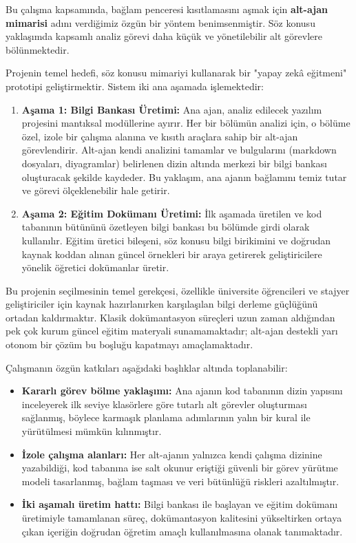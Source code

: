 Bu çalışma kapsamında, bağlam penceresi kısıtlamasını aşmak için \textbf{alt-ajan mimarisi} adını verdiğimiz özgün bir yöntem benimsenmiştir. Söz konusu yaklaşımda kapsamlı analiz görevi daha küçük ve yönetilebilir alt görevlere bölünmektedir.

Projenin temel hedefi, söz konusu mimariyi kullanarak bir "yapay zekâ eğitmeni" prototipi geliştirmektir. Sistem iki ana aşamada işlemektedir:
\begin{enumerate}
    \item \textbf{Aşama 1: Bilgi Bankası Üretimi:} Ana ajan, analiz edilecek yazılım projesini mantıksal modüllerine ayırır. Her bir bölümün analizi için, o bölüme özel, izole bir çalışma alanına ve kısıtlı araçlara sahip bir alt-ajan görevlendirir. Alt-ajan kendi analizini tamamlar ve bulgularını (markdown dosyaları, diyagramlar) belirlenen dizin altında merkezi bir bilgi bankası oluşturacak şekilde kaydeder. Bu yaklaşım, ana ajanın bağlamını temiz tutar ve görevi ölçeklenebilir hale getirir.
    \item \textbf{Aşama 2: Eğitim Dokümanı Üretimi:} İlk aşamada üretilen ve kod tabanının bütününü özetleyen bilgi bankası bu bölümde girdi olarak kullanılır. Eğitim üretici bileşeni, söz konusu bilgi birikimini ve doğrudan kaynak koddan alınan güncel örnekleri bir araya getirerek geliştiricilere yönelik öğretici dokümanlar üretir.
\end{enumerate}

    Bu projenin seçilmesinin temel gerekçesi, özellikle üniversite öğrencileri ve stajyer geliştiriciler için kaynak hazırlanırken karşılaşılan bilgi derleme güçlüğünü ortadan kaldırmaktır. Klasik dokümantasyon süreçleri uzun zaman aldığından pek çok kurum güncel eğitim materyali sunamamaktadır; alt-ajan destekli yarı otonom bir çözüm bu boşluğu kapatmayı amaçlamaktadır.

Çalışmanın özgün katkıları aşağıdaki başlıklar altında toplanabilir:
\begin{itemize}
        \item \textbf{Kararlı görev bölme yaklaşımı:} Ana ajanın kod tabanının dizin yapısını inceleyerek ilk seviye klasörlere göre tutarlı alt görevler oluşturması sağlanmış, böylece karmaşık planlama adımlarının yalın bir kural ile yürütülmesi mümkün kılınmıştır.
        \item \textbf{İzole çalışma alanları:} Her alt-ajanın yalnızca kendi çalışma dizinine yazabildiği, kod tabanına ise salt okunur eriştiği güvenli bir görev yürütme modeli tasarlanmış, bağlam taşması ve veri bütünlüğü riskleri azaltılmıştır.
        \item \textbf{İki aşamalı üretim hattı:} Bilgi bankası ile başlayan ve eğitim dokümanı üretimiyle tamamlanan süreç, dokümantasyon kalitesini yükseltirken ortaya çıkan içeriğin doğrudan öğretim amaçlı kullanılmasına olanak tanımaktadır.
\end{itemize}

